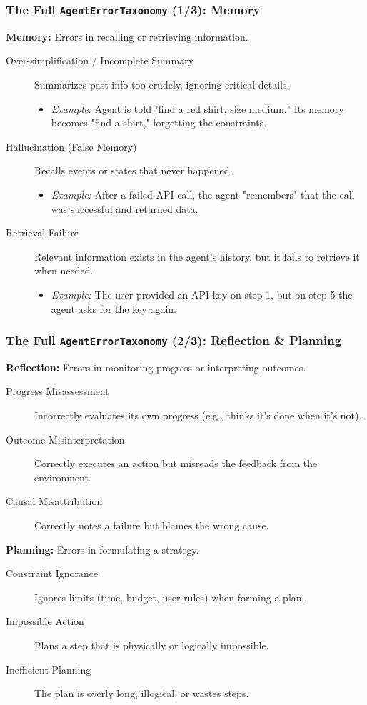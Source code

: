 \documentclass[10pt]{beamer}
\begin{document}
\begin{frame}[fragile]
  \frametitle{The Full \texttt{AgentErrorTaxonomy} (1/3): Memory}
  \textbf{Memory:} Errors in recalling or retrieving information.
  \begin{description}
    \item[Over-simplification / Incomplete Summary] Summarizes past info too crudely, ignoring critical details.
    \begin{itemize}
        \item \textit{Example:} Agent is told "find a red shirt, size medium." Its memory becomes "find a shirt," forgetting the constraints.
    \end{itemize}
    \vfill
    \item[Hallucination (False Memory)] Recalls events or states that never happened.
    \begin{itemize}
        \item \textit{Example:} After a failed API call, the agent "remembers" that the call was successful and returned data.
    \end{itemize}
    \vfill
    \item[Retrieval Failure] Relevant information exists in the agent's history, but it fails to retrieve it when needed.
    \begin{itemize}
        \item \textit{Example:} The user provided an API key on step 1, but on step 5 the agent asks for the key again.
    \end{itemize}
  \end{description}
\end{frame}

\begin{frame}[fragile]
  \frametitle{The Full \texttt{AgentErrorTaxonomy} (2/3): Reflection \& Planning}
  \textbf{Reflection:} Errors in monitoring progress or interpreting outcomes.
  \begin{description}
    \item[Progress Misassessment] Incorrectly evaluates its own progress (e.g., thinks it's done when it's not).
    \item[Outcome Misinterpretation] Correctly executes an action but misreads the feedback from the environment.
    \item[Causal Misattribution] Correctly notes a failure but blames the wrong cause.
  \end{description}
  
  \vfill
  
  \textbf{Planning:} Errors in formulating a strategy.
  \begin{description}
    \item[Constraint Ignorance] Ignores limits (time, budget, user rules) when forming a plan.
    \item[Impossible Action] Plans a step that is physically or logically impossible.
    \item[Inefficient Planning] The plan is overly long, illogical, or wastes steps.
  \end{description}
\end{frame}
\end{document}
